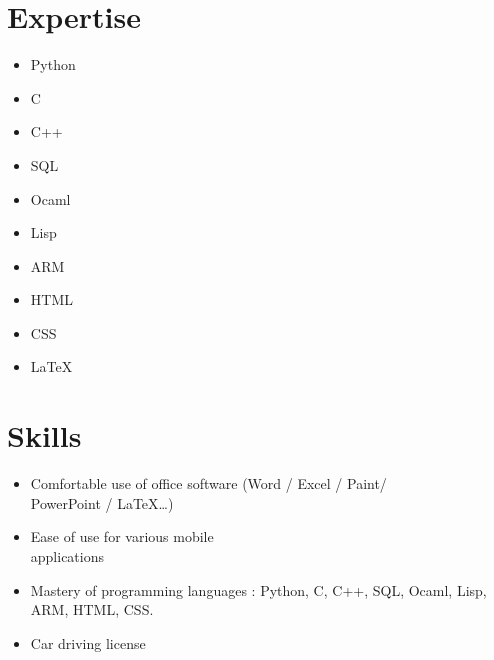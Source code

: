\documentclass[9pt, oneside, a4paper, titlepage]{extarticle}
\begin{document}
\begin{tcolorbox}
\begin{minipage}[t]{6.2cm}
\begin{spacing}{0.95}
\begin{tcolorbox}[grow to left by = 0.6cm, colback = gray!25, colframe = white]
                \section*{Expertise}
                \begin{multicols}{2}
                \begin{itemize}
                    \item Python
                    \item C
                    \item C++
                    \item SQL
                    \item Ocaml
                    \columnbreak                    
                    \item Lisp
                    \item ARM
                    \item HTML
                    \item CSS
                    \item \LaTeX
                \end{itemize}
                \end{multicols}
                \vspace*{0.2cm}
                \section*{Skills}

                \begin{itemize}
                    \vspace*{0.3cm}
                    \item Comfortable use of office software (Word / Excel / Paint/ \\PowerPoint / \LaTeX \ldots)
                    \vspace*{0.2cm}
                    \item Ease of use for various mobile \\applications
                    \vspace*{0.2cm}
                    \item Mastery of programming languages : Python, C, C++, SQL, Ocaml, Lisp, ARM, HTML, CSS.
                    \vspace*{0.2cm}
                    \item Car driving license\\

                \end{itemize}



\end{tcolorbox}
\end{spacing}
\end{minipage}
\end{tcolorbox}
\end{document}
